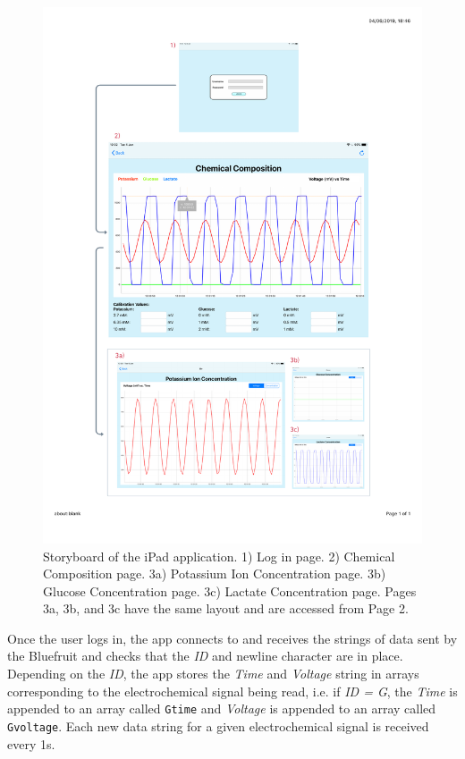 \begin{figure}[p]
\centering
\includegraphics[trim={1cm 2.5cm 1cm  2cm}, clip, width=1\textwidth]{./figures/appStoryboard3.pdf}
\captionsetup{justification=centering}
\caption{Storyboard of the iPad application. 1) Log in page. 2) Chemical Composition page. 3a) Potassium Ion Concentration page. 3b) Glucose Concentration page. 3c) Lactate Concentration page. Pages 3a, 3b, and 3c have the same layout and are accessed from Page 2.}
\label{fig: storyboard}
\end{figure}

Once the user logs in, the app connects to and receives the strings of data sent by the Bluefruit and checks that the \textit{ID} and newline character are in place. Depending on the \textit{ID}, the app stores the \textit{Time} and \textit{Voltage} string in arrays corresponding to the electrochemical signal being read, i.e. if \textit{ID = G}, the \textit{Time} is appended to an array called  {\tt{Gtime}} and \textit{Voltage} is appended to an array called {\tt{Gvoltage}}. Each new data string for a given electrochemical signal is received every 1s. 

